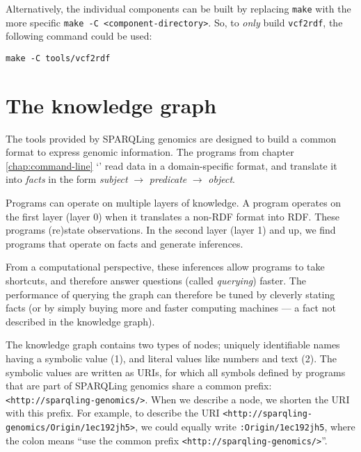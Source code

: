   Alternatively, the individual components can be built by replacing
  \texttt{make} with the more specific \texttt{make -C <component-directory>}.
  So, to \emph{only} build \texttt{vcf2rdf}, the following command could be
  used:

\begin{siderules}
\begin{verbatim}
make -C tools/vcf2rdf
\end{verbatim}
\end{siderules}

\chapter{The knowledge graph}

  The tools provided by SPARQLing genomics are designed to build a
  common format to express genomic information.  The programs from chapter
  \ref{chap:command-line} {\color{LinkGray}`'}
  read data in a domain-specific format, and translate it into \emph{facts}
  in the form \emph{subject} $\rightarrow$ \emph{predicate} $\rightarrow$
  \emph{object}.

  Programs can operate on multiple layers of knowledge.  A program operates
  on the first layer (layer 0) when it translates a non-RDF format into RDF.
  These programs (re)state observations.  In the second layer (layer 1) and
  up, we find programs that operate on facts and generate inferences.

  From a computational perspective, these inferences allow programs to take
  shortcuts, and therefore answer questions (called \emph{querying}) faster.
  The performance of querying the graph can therefore be tuned by cleverly
  stating facts (or by simply buying more and faster computing machines ---
  a fact not described in the knowledge graph).

  \begin{sloppypar}
  The knowledge graph contains two types of nodes; uniquely identifiable
  names having a symbolic value (1), and literal values like numbers and
  text (2).  The symbolic values are written as URIs, for which all symbols
  defined by programs that are part of SPARQLing genomics share a common
  prefix: \texttt{<http://sparqling-genomics/>}.  When we describe a node,
  we shorten the URI with this prefix.  For example, to describe the URI
  \texttt{<http://sparqling-genomics/Origin/1ec192jh5>}, we could equally
  write \texttt{:Origin/1ec192jh5}, where the colon means ``use the
  common prefix \texttt{<http://sparqling-genomics/>}''.
  \end{sloppypar}


